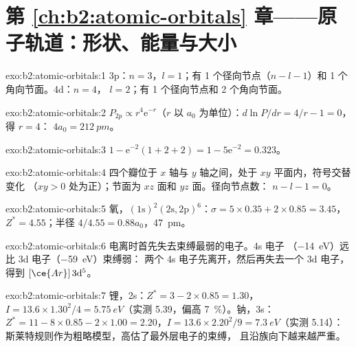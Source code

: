 \section*{第 \ref{ch:b2:atomic-orbitals} 章——原子轨道：形状、能量与大小}

\begin{solution}{exo:b2:atomic-orbitals:1}
3p：$n = 3$，$l = 1$；有 1 个径向节点（$n - l - 1$）和 1 个角向节面。4d：$n = 4$，
$l = 2$；有 1 个径向节点和 2 个角向节面。
\end{solution}

\begin{solution}{exo:b2:atomic-orbitals:2}
$P_{2p} \propto r^4\mathrm e^{-r}$（$r$ 以 $a_0$ 为单位）：$d\ln P/dr = 4/r - 1 = 0$，得 $r = 4$：
$4a_0 = \qty{212}{pm}$。
\end{solution}

\begin{solution}{exo:b2:atomic-orbitals:3}
$1 - \mathrm e^{-2}(1 + 2 + 2) = 1 - 5\mathrm e^{-2} = 0.323$。
\end{solution}

\begin{solution}{exo:b2:atomic-orbitals:4}
四个瓣位于 $x$ 轴与 $y$ 轴之间，处于 $xy$ 平面内，符号交替变化
（$xy > 0$ 处为正）；节面为 $xz$ 面和 $yz$ 面。径向节点数：
$n - l - 1 = 0$。
\end{solution}

\begin{solution}{exo:b2:atomic-orbitals:5}
氧，$(1\mathrm s)^2(2\mathrm s, 2\mathrm p)^6$：$\sigma = 5 \times 0.35 + 2 \times 0.85
= 3.45$，$Z^* = 4.55$；半径 $4/4.55 = 0.88a_0$，\qty{47}{pm}。
\end{solution}

\begin{solution}{exo:b2:atomic-orbitals:6}
电离时首先失去束缚最弱的电子。4s 电子
（\qty{-14}{eV}）远比 3d 电子（\qty{-59}{eV}）束缚弱：
两个 4s 电子先离开，然后再失去一个 3d 电子，得到 $[\ce{Ar}]\,3\mathrm d^5$。
\end{solution}

\begin{solution}{exo:b2:atomic-orbitals:7}
锂，2s：$Z^* = 3 - 2 \times 0.85 = 1.30$，$I = 13.6 \times 1.30^2/4 =
\qty{5.75}{eV}$（实测 5.39，偏高 7~\%）。钠，3s：$Z^* = 11 - 8 \times 0.85 -
2 \times 1.00 = 2.20$，$I = 13.6 \times 2.20^2/9 = \qty{7.3}{eV}$（实测 5.14）：
斯莱特规则作为粗略模型，高估了最外层电子的束缚，
且沿族向下越来越严重。
\end{solution}

